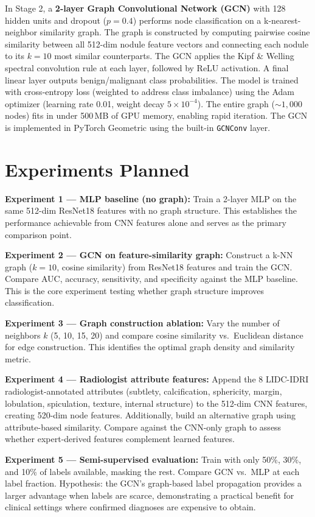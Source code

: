 \documentclass[12pt]{article}
\begin{document}
In Stage 2, a \textbf{2-layer Graph Convolutional Network (GCN)} with 128 hidden units and dropout ($p = 0.4$) performs node classification on a k-nearest-neighbor similarity graph. The graph is constructed by computing pairwise cosine similarity between all 512-dim nodule feature vectors and connecting each nodule to its $k = 10$ most similar counterparts. The GCN applies the Kipf \& Welling spectral convolution rule at each layer, followed by ReLU activation. A final linear layer outputs benign/malignant class probabilities. The model is trained with cross-entropy loss (weighted to address class imbalance) using the Adam optimizer (learning rate 0.01, weight decay $5 \times 10^{-4}$). The entire graph (${\sim}1{,}000$ nodes) fits in under 500\,MB of GPU memory, enabling rapid iteration. The GCN is implemented in PyTorch Geometric using the built-in \texttt{GCNConv} layer.

\section*{Experiments Planned}

\textbf{Experiment 1 --- MLP baseline (no graph):} Train a 2-layer MLP on the same 512-dim ResNet18 features with no graph structure. This establishes the performance achievable from CNN features alone and serves as the primary comparison point.

\textbf{Experiment 2 --- GCN on feature-similarity graph:} Construct a k-NN graph ($k = 10$, cosine similarity) from ResNet18 features and train the GCN. Compare AUC, accuracy, sensitivity, and specificity against the MLP baseline. This is the core experiment testing whether graph structure improves classification.

\textbf{Experiment 3 --- Graph construction ablation:} Vary the number of neighbors $k$ (5, 10, 15, 20) and compare cosine similarity vs.\ Euclidean distance for edge construction. This identifies the optimal graph density and similarity metric.

\textbf{Experiment 4 --- Radiologist attribute features:} Append the 8 LIDC-IDRI radiologist-annotated attributes (subtlety, calcification, sphericity, margin, lobulation, spiculation, texture, internal structure) to the 512-dim CNN features, creating 520-dim node features. Additionally, build an alternative graph using attribute-based similarity. Compare against the CNN-only graph to assess whether expert-derived features complement learned features.

\textbf{Experiment 5 --- Semi-supervised evaluation:} Train with only 50\%, 30\%, and 10\% of labels available, masking the rest. Compare GCN vs.\ MLP at each label fraction. Hypothesis: the GCN's graph-based label propagation provides a larger advantage when labels are scarce, demonstrating a practical benefit for clinical settings where confirmed diagnoses are expensive to obtain.
\end{document}
